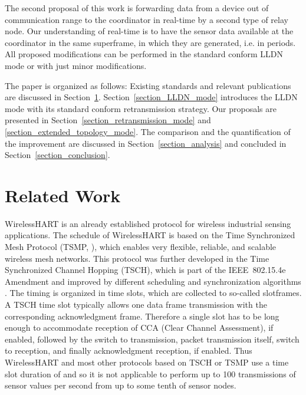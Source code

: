 \documentclass[times,10pt,twocolumn]{article}
\begin{document}
The second proposal of this work is forwarding data from a device out of communication range to the coordinator in real-time by a second type of relay node. Our understanding of real-time is to have the sensor data available at the coordinator in the same superframe, in which they are generated, i.e. in  periods. All proposed modifications can be performed in the standard conform LLDN mode or with just minor modifications.

The paper is organized as follows: Existing standards and relevant publications are discussed in Section~\ref{section_related_work}. Section~\ref{section_LLDN_mode} introduces the LLDN mode with its standard conform retransmission strategy. Our proposals are presented in Section~\ref{section_retransmission_mode} and \ref{section_extended_topology_mode}. The comparison and the quantification of the improvement are discussed in Section~\ref{section_analysis} and concluded in Section~\ref{section_conclusion}.

\section{Related Work}
\label{section_related_work}
WirelessHART is an already established protocol for wireless industrial sensing applications. The schedule of WirelessHART is based on the Time Synchronized Mesh Protocol (TSMP, \cite{TSMP}), which enables very flexible, reliable, and scalable wireless mesh networks. This protocol was further developed in the Time Synchronized Channel Hopping (TSCH), which is part of the IEEE~802.15.4e Amendment and improved by different scheduling and synchronization algorithms \cite{Adapt_Sync_in_802_15_4e}. The timing is organized in time slots, which are collected to so-called slotframes. A TSCH time slot typically allows one data frame transmission with the corresponding acknowledgment frame. Therefore a single slot has to be long enough to accommodate reception of CCA (Clear Channel Assessment), if enabled, followed by the switch to transmission, packet transmission itself, switch to reception, and finally acknowledgment reception, if enabled. Thus WirelessHART and most other protocols based on TSCH or TSMP use a time slot duration of  and so it is not applicable to perform up to 100 transmissions of sensor values per second from up to some tenth of sensor nodes.
\end{document}
